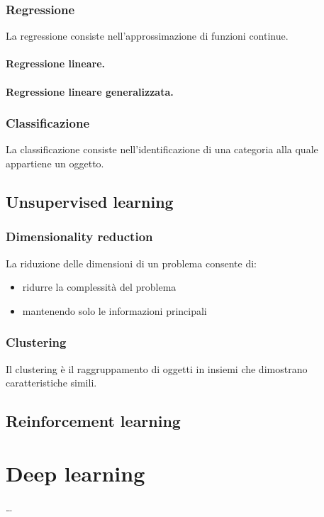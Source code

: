 \subsubsection{Regressione}
La regressione consiste nell'approssimazione di funzioni continue.
\paragraph{Regressione lineare.}
\paragraph{Regressione lineare generalizzata.}

\subsubsection{Classificazione}
La classificazione consiste nell'identificazione di una categoria alla quale appartiene un oggetto.


\subsection{Unsupervised learning}

\subsubsection{Dimensionality reduction}
La riduzione delle dimensioni di un problema consente di:
\begin{itemize}
    \item ridurre la complessità del problema
    \item mantenendo solo le informazioni principali
\end{itemize}

\begin{example}
\end{example}

\subsubsection{Clustering}
Il clustering è il raggruppamento di oggetti in insiemi che dimostrano caratteristiche simili.


\subsection{Reinforcement learning}

\section{Deep learning}
\dots


